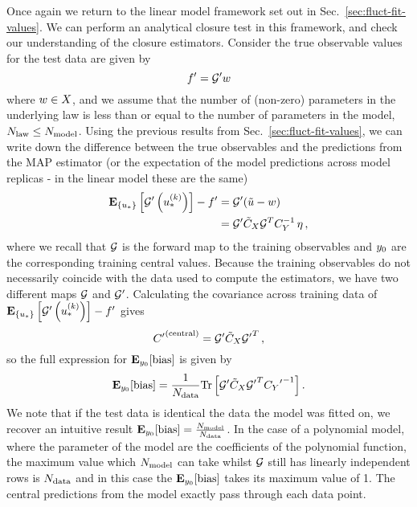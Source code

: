 Once again we return to the linear model framework set out in
Sec.~\ref{sec:fluct-fit-values}. We can perform an analytical closure test in
this framework, and check our understanding of the closure estimators. Consider
the true observable values for the test data are given by
\begin{equation}
    \label{eq:LinearLawMap}
    {{f}^{\prime}} = {{\mathcal{G}}^{\prime}} w
\end{equation}
where $w \in X$, and we assume that the number of (non-zero)
parameters in the underlying law is less than or equal to the number of
parameters in the model, $N_{\rm law} \leq N_{\rm model}$. Using the previous results from
Sec.~\ref{sec:fluct-fit-values}, we can write down the difference between the
true observables and the predictions from the MAP estimator (or the expectation
of the model predictions across model replicas - in the linear model these are
the same)
\begin{equation}
    \begin{split}
        \mathbf{E}_{\{ u_* \}} \left[ {{\mathcal{G}}^{\prime}}\left(u_*^{(k)}\right) \right] - {{f}^{\prime}} &=
        {{\mathcal{G}}^{\prime}} (\tilde{u} - w ) \\
        &= {{\mathcal{G}}^{\prime}} \tilde{C}_X \mathcal{G}^T C_{Y}^{-1} \, \eta \, ,
    \end{split}
\end{equation}
where we recall that $\mathcal{G}$ is the forward map to the training observables
and $y_0$ are the corresponding training central values. Because the
training observables do not necessarily coincide with the data used to compute
the estimators, we have two different maps $\mathcal{G}$ and $\mathcal{G}'$. Calculating
the covariance across training data of
$\mathbf{E}_{\{ u_* \}} \left[ {{\mathcal{G}}^{\prime}}\left(u_*^{(k)}\right) \right] - {{f}^{\prime}}$ gives
\begin{equation}
    {{C}^{\prime}}^{(\rm central)} = {{\mathcal{G}}^{\prime}} \tilde{C}_X {{\mathcal{G}}^{\prime}}^T \, ,
\end{equation}
so the full expression for $\mathbf{E}_{y_0}[{\rm bias}]$ is given by
\begin{equation}\label{eq:BiasLinearModel}
    \mathbf{E}_{y_0}[{\rm bias}] = \frac{1}{N_{\rm data}}
    {\rm Tr} \left[
        {{\mathcal{G}}^{\prime}} \tilde{C}_X {{\mathcal{G}}^{\prime}}^T
        {{C_{Y}}^{\prime}}^{-1}
    \right].
\end{equation}
We note that if the test data is identical the data the model was fitted on, we
recover an intuitive result $\mathbf{E}_{y_0}[{\rm bias}] =
\frac{N_{\rm model}}{N_{\rm data}}$. In the case of a polynomial model, where the parameter
of the model are the coefficients of the polynomial function, the maximum value
which $N_{\rm model}$ can take whilst $\mathcal{G}$ still has linearly independent rows is
$N_{\rm data}$ and in this case the $\mathbf{E}_{y_0}[{\rm bias}]$ takes its
maximum value of 1. The central predictions from the model exactly pass through
each data point.

